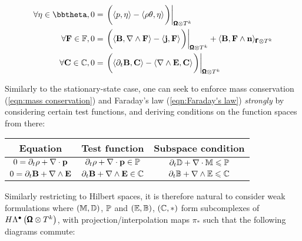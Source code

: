 \begin{align}
        \forall \eta \in \bbtheta,  0  &=  \left.\left(\langle p, \eta\rangle - \langle\rho\theta, \eta\rangle\tall\right)\right|_{\bfOmega\otimes T^{k}}  \\
        \forall \bfF \in \bbF,  0  &=  \left.\left(\langle\bfB, \nabla\wedge\bfF\rangle - \langle\bfj, \bfF\rangle\tall\right)\right|_{\bfOmega\otimes T^{k}} + \langle\bfB, \bfF\wedge\bfn\rangle_{\bfGamma\otimes T^{k}}  \\
        \forall \bfC \in \bbC,  0  &=  \left.\left(\langle\partial_{t}\bfB, \bfC\rangle - \langle\nabla\wedge\bfE, \bfC\rangle\tall\right)\right|_{\bfOmega\otimes T^{k}}
    \end{align}

    \line

    Similarly to the stationary-state case, one can seek to enforce mass conservation (\ref{eqn:mass conservation}) and Faraday's law (\ref{eqn:Faraday's law}) \emph{strongly} by considering certain test functions, and deriving conditions on the function spaces from there:
    \begin{center}\begin{tabular}{ c | c | c }
        Equation  &  Test function  &  Subspace condition  \\
        \hline\hline
        $0  =  \partial_{t}\rho + \nabla\cdot\mathbf{p}$  &  $\partial_{t}\rho + \nabla\cdot\mathbf{p}  \in  \mathbb{P}$  &  $\partial_{t}\mathbb{D} + \nabla\cdot\mathbb{M}  \leqslant  \mathbb{P}$  \\
        $0  =  \partial_{t}\mathbf{B} + \nabla\wedge\mathbf{E}$  &  $\partial_{t}\mathbf{B} + \nabla\wedge\mathbf{E}  \in  \mathbb{C}$  &  $\partial_{t}\mathbb{B} + \nabla\wedge\mathbb{E}  \leqslant  \mathbb{C}$
    \end{tabular}\end{center}
    Similarly restricting to Hilbert spaces, it is therefore natural to consider weak formulations where $(\mathbb{M}, \mathbb{D})$, $\mathbb{P}$ and $(\mathbb{E}, \mathbb{B})$, $(\mathbb{C}, *)$ form subcomplexes of $H\Lambda^{\bullet}\left(\pmb{\mathsf{\Omega}}\otimes T^{k}\right)$, with projection/interpolation maps $\pi_{*}$ such that the following diagrams commute:
